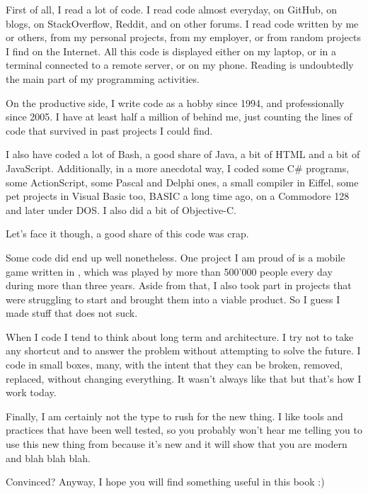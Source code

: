 \bigskip

First of all, I read a lot of code. I read code almost everyday, on
GitHub, on blogs, on StackOverflow, Reddit, and on other forums. I
read code written by me or others, from my personal projects, from my
employer, or from random projects I find on the Internet. All this
code is displayed either on my laptop, or in a terminal connected to a
remote server, or on my phone. Reading is undoubtedly the main part of
my programming activities.

On the productive side, I write code as a hobby since 1994, and
professionally since 2005. I have at least half a million of \cpp{}
behind me, just counting the lines of code that survived in past
projects I could find.

I also have coded a lot of Bash, a good share of Java, a bit of HTML
and a bit of JavaScript. Additionally, in a more anecdotal way, I
coded some C\# programs, some ActionScript, some Pascal and Delphi
ones, a small compiler in Eiffel, some pet projects in Visual Basic
too, BASIC a long time ago, on a Commodore 128 and later under DOS. I
also did a bit of Objective-C.

Let's face it though, a good share of this code was crap.

\bigskip

Some code did end up well nonetheless. One project I am proud of is a
mobile game written in \cpp, which was played by more than 500'000
people every day during more than three years. Aside from that, I also
took part in projects that were struggling to start and brought them
into a viable product. So I guess I made stuff that does not suck.

When I code I tend to think about long term and architecture. I try
not to take any shortcut and to answer the problem without attempting
to solve the future. I code in small boxes, many, with the intent that
they can be broken, removed, replaced, without changing everything. It
wasn't always like that but that's how I work today.

Finally, I am certainly not the type to rush for the new thing. I like
tools and practices that have been well tested, so you probably won't
hear me telling you to use this new thing from  because it's
new and it will show that you are modern and blah blah blah.

\bigskip

Convinced? Anyway, I hope you will find something useful in this book :)

